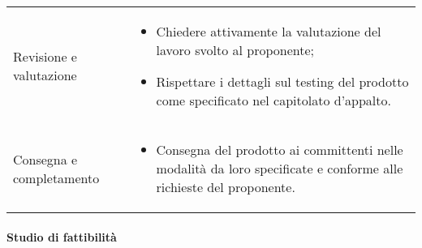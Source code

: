 {\begin{longtable}{ C{4cm} C{12cm}}
	Revisione e valutazione & \begin{itemize} \item Chiedere attivamente la valutazione del lavoro svolto al proponente; \item Rispettare i dettagli sul testing del prodotto come specificato nel capitolato d'appalto. \end{itemize}\\	
	Consegna e completamento & \begin{itemize} \item Consegna del prodotto ai committenti nelle modalità da loro specificate e conforme alle richieste del proponente. \end{itemize}\\
\end{longtable}
}
\paragraph{Studio di fattibilità}



